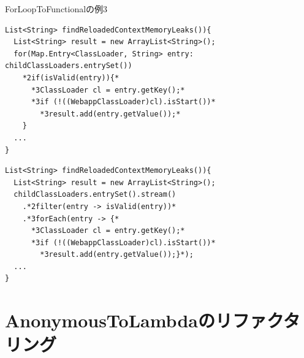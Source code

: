 \begin{frame}[fragile]{ForLoopToFunctionalの例3}

\begin{lstlisting}[moredelim={**[is][{\btHL<2>}]{*2}{*}},
moredelim={**[is][{\btHL<3>}]{*3}{*}}]
List<String> findReloadedContextMemoryLeaks()){
  List<String> result = new ArrayList<String>();
  for(Map.Entry<ClassLoader, String> entry: childClassLoaders.entrySet())
    *2if(isValid(entry)){*
      *3ClassLoader cl = entry.getKey();*
      *3if (!((WebappClassLoader)cl).isStart())*
        *3result.add(entry.getValue());*
    }
  ...
}
\end{lstlisting}
\begin{lstlisting}[morekeywords={filter,stream,anyMatch,map,reduce,forEach},
  moredelim={**[is][{\btHL<2>}]{*2}{*}},
  moredelim={**[is][{\btHL<3>}]{*3}{*}}]
List<String> findReloadedContextMemoryLeaks()){
  List<String> result = new ArrayList<String>();
  childClassLoaders.entrySet().stream()
    .*2filter(entry -> isValid(entry))*
    .*3forEach(entry -> {*
      *3ClassLoader cl = entry.getKey();*
      *3if (!((WebappClassLoader)cl).isStart())*
        *3result.add(entry.getValue());}*);
  ...
}
\end{lstlisting}
\end{frame}
\section{AnonymousToLambdaのリファクタリング}
